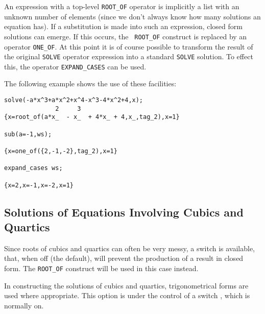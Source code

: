\hypertarget{operator:ONE_OF}{}
\hypertarget{operator:EXPAND_CASES}{}
An expression with a top-level \texttt{ROOT\_OF} operator is implicitly a
list with an unknown number of elements (since we don't always know how
many solutions an equation has).  If a substitution is made into such an
expression, closed form solutions can emerge.  If this occurs, the {\tt
ROOT\_OF} construct is replaced by an operator \texttt{ONE\_OF}.
At this point it is of course possible to transform the result of the
original \texttt{SOLVE} operator expression into a standard \texttt{SOLVE}
solution.  To effect this, the operator \texttt{EXPAND\_CASES}
 can be used.

The following example shows the use of these facilities:
\begin{verbatim}
solve(-a*x^3+a*x^2+x^4-x^3-4*x^2+4,x);
              2     3
{x=root_of(a*x_  - x_  + 4*x_ + 4,x_,tag_2),x=1}

sub(a=-1,ws);

{x=one_of({2,-1,-2},tag_2),x=1}

expand_cases ws;

{x=2,x=-1,x=-2,x=1}
\end{verbatim}

\subsection{Solutions of Equations Involving Cubics and Quartics}
\hypertarget{switch:FULLROOTS}{}
\hypertarget{switch:TRIGFORM}{}

Since roots of cubics and quartics can often be very messy, a switch
 is available, that, when off (the
default), will prevent the production of a result in closed form.  The
\texttt{ROOT\_OF} construct will be used in this case instead.

In constructing the solutions of cubics and quartics, trigonometrical
forms are used where appropriate.  This option is under the control of a
switch , which is normally on.


